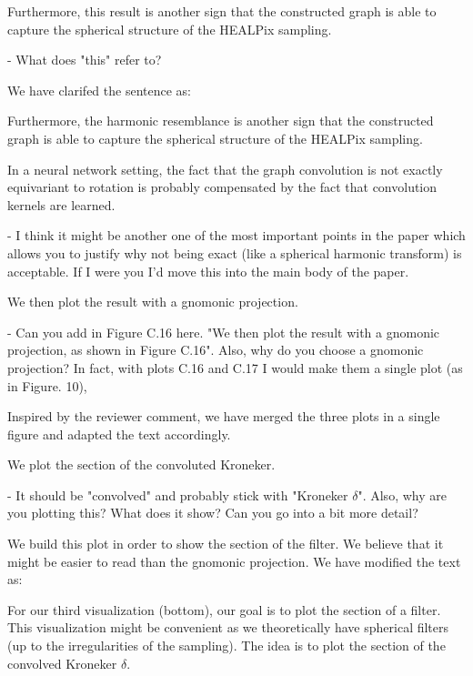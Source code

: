 \documentclass[12pt,a4paper]{article}
\newcommand{\nati}[1]{{\color[rgb]{.1,.6,.1}{NP: #1}}}
\newcommand{\todo}[1]{{\color[rgb]{.6,.1,.6}{TODO: #1}}}
\newcommand{\1}{\b{1}}              %
\newcommand{\0}{\b{0}}              %
\begin{document}
\begin{mdframed}[style=comment]
Furthermore, this result is another sign that the constructed graph is able to capture the spherical structure of the HEALPix sampling.

- What does "this" refer to?
\end{mdframed}
We have clarifed the sentence as:
\begin{mdframed}[style=manuscript]
Furthermore, the harmonic resemblance is another sign that the constructed graph is able to capture the spherical
structure of the HEALPix sampling.
\end{mdframed}

\begin{mdframed}[style=comment]
In a neural network setting, the fact that the graph convolution is not exactly equivariant to rotation is probably compensated by the fact that convolution kernels are learned.

- I think it might be another one of the most important points in the paper which allows you to justify why not being exact (like a spherical harmonic transform) is acceptable. If I were you I'd move this into the main body of the paper.
\end{mdframed}
\todo{Assign: @all, \nati{What do you think? I had the feeling we already have that in the main body of the paper. I cannot remember where, though.}}

\begin{mdframed}[style=comment]
We then plot the result with a gnomonic projection.

- Can you add in Figure C.16 here. "We then plot the result with a gnomonic projection, as shown in Figure C.16". Also, why do you choose a gnomonic projection? In fact, with plots C.16 and C.17 I would make them a single plot (as in Figure. 10),
\end{mdframed}
Inspired by the reviewer comment, we have merged the three plots in a single figure and adapted the text accordingly.

\begin{mdframed}[style=comment]
We plot the section of the convoluted Kroneker.

- It should be "convolved" and probably stick with "Kroneker $\delta$". Also, why are you plotting this? What does it show? Can you go into a bit more detail?
\end{mdframed}
We build this plot in order to show the section of the filter. We believe that it might be easier to read than the gnomonic projection. We have modified the text as:
\begin{mdframed}[style=manuscript]
For our third visualization (bottom), our goal is to plot the section of a filter. This visualization might be convenient as we theoretically have spherical filters (up to the irregularities of the sampling). The idea is to plot the section of the convolved Kroneker $\delta$.
\end{mdframed}
\end{document}
